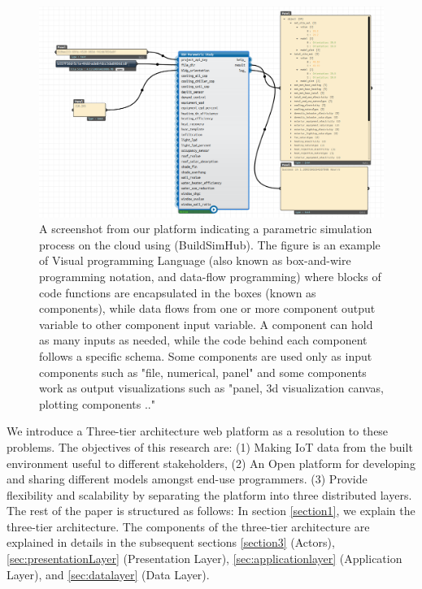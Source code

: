 \documentclass{scsSimAUDPaperFormat}
\begin{document}
\begin{figure}
\centering
\includegraphics[width=0.9\columnwidth]{imgs/vpl_example.png}
\caption{A screenshot from our platform indicating a parametric simulation process on the cloud using (BuildSimHub). The figure is an example of Visual programming Language (also known as box-and-wire programming notation, and data-flow programming) where blocks of code functions are encapsulated in the boxes (known as components), while data flows from one or more component output variable to other component input variable. A component can hold as many inputs as needed, while the code behind each component follows a specific schema. Some components are used only as input components such as "file, numerical, panel" and some components work as output visualizations such as "panel, 3d visualization canvas, plotting components .."}
\label{fig:vpl_example}
\end{figure}
We introduce a Three-tier architecture web platform as a resolution to these problems. The objectives of this research are: (1) Making IoT data from the built environment useful to different stakeholders, (2) An Open platform for developing and sharing different models amongst end-use programmers. (3) Provide flexibility and scalability by separating the platform into three distributed layers. The rest of the paper is structured as follows: In section \ref{section1}, we explain the three-tier architecture. The components of the three-tier architecture are explained in details in the subsequent sections \ref{section3} (Actors), \ref{sec:presentationLayer} (Presentation Layer), \ref{sec:applicationlayer} (Application Layer), and \ref{sec:datalayer} (Data Layer).
\end{document}

